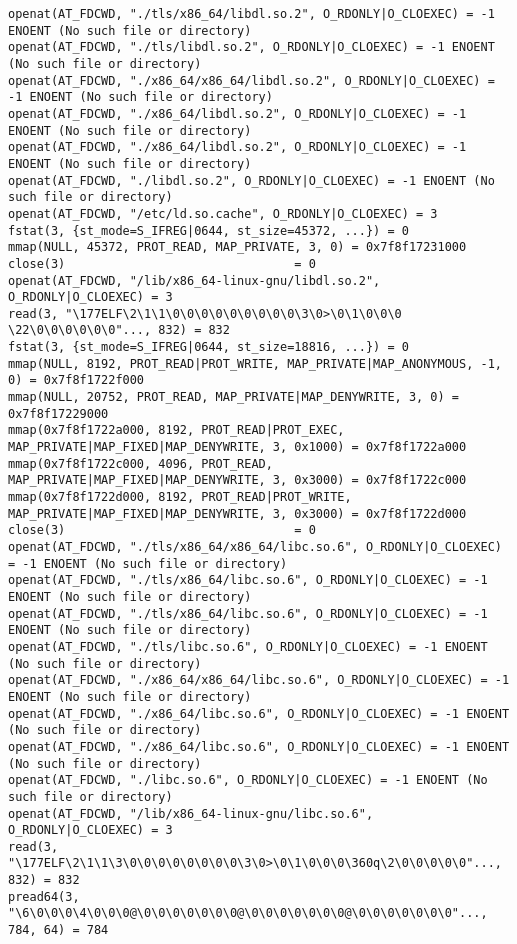 \documentclass[pdf, unicode, 12pt, a4paper,oneside,fleqn]{article}
\begin{document}
{\begin{verbatim}
openat(AT_FDCWD, "./tls/x86_64/libdl.so.2", O_RDONLY|O_CLOEXEC) = -1 ENOENT (No such file or directory)
openat(AT_FDCWD, "./tls/libdl.so.2", O_RDONLY|O_CLOEXEC) = -1 ENOENT (No such file or directory)
openat(AT_FDCWD, "./x86_64/x86_64/libdl.so.2", O_RDONLY|O_CLOEXEC) = -1 ENOENT (No such file or directory)
openat(AT_FDCWD, "./x86_64/libdl.so.2", O_RDONLY|O_CLOEXEC) = -1 ENOENT (No such file or directory)
openat(AT_FDCWD, "./x86_64/libdl.so.2", O_RDONLY|O_CLOEXEC) = -1 ENOENT (No such file or directory)
openat(AT_FDCWD, "./libdl.so.2", O_RDONLY|O_CLOEXEC) = -1 ENOENT (No such file or directory)
openat(AT_FDCWD, "/etc/ld.so.cache", O_RDONLY|O_CLOEXEC) = 3
fstat(3, {st_mode=S_IFREG|0644, st_size=45372, ...}) = 0
mmap(NULL, 45372, PROT_READ, MAP_PRIVATE, 3, 0) = 0x7f8f17231000
close(3)                                = 0
openat(AT_FDCWD, "/lib/x86_64-linux-gnu/libdl.so.2", O_RDONLY|O_CLOEXEC) = 3
read(3, "\177ELF\2\1\1\0\0\0\0\0\0\0\0\0\3\0>\0\1\0\0\0 \22\0\0\0\0\0\0"..., 832) = 832
fstat(3, {st_mode=S_IFREG|0644, st_size=18816, ...}) = 0
mmap(NULL, 8192, PROT_READ|PROT_WRITE, MAP_PRIVATE|MAP_ANONYMOUS, -1, 0) = 0x7f8f1722f000
mmap(NULL, 20752, PROT_READ, MAP_PRIVATE|MAP_DENYWRITE, 3, 0) = 0x7f8f17229000
mmap(0x7f8f1722a000, 8192, PROT_READ|PROT_EXEC, MAP_PRIVATE|MAP_FIXED|MAP_DENYWRITE, 3, 0x1000) = 0x7f8f1722a000
mmap(0x7f8f1722c000, 4096, PROT_READ, MAP_PRIVATE|MAP_FIXED|MAP_DENYWRITE, 3, 0x3000) = 0x7f8f1722c000
mmap(0x7f8f1722d000, 8192, PROT_READ|PROT_WRITE, MAP_PRIVATE|MAP_FIXED|MAP_DENYWRITE, 3, 0x3000) = 0x7f8f1722d000
close(3)                                = 0
openat(AT_FDCWD, "./tls/x86_64/x86_64/libc.so.6", O_RDONLY|O_CLOEXEC) = -1 ENOENT (No such file or directory)
openat(AT_FDCWD, "./tls/x86_64/libc.so.6", O_RDONLY|O_CLOEXEC) = -1 ENOENT (No such file or directory)
openat(AT_FDCWD, "./tls/x86_64/libc.so.6", O_RDONLY|O_CLOEXEC) = -1 ENOENT (No such file or directory)
openat(AT_FDCWD, "./tls/libc.so.6", O_RDONLY|O_CLOEXEC) = -1 ENOENT (No such file or directory)
openat(AT_FDCWD, "./x86_64/x86_64/libc.so.6", O_RDONLY|O_CLOEXEC) = -1 ENOENT (No such file or directory)
openat(AT_FDCWD, "./x86_64/libc.so.6", O_RDONLY|O_CLOEXEC) = -1 ENOENT (No such file or directory)
openat(AT_FDCWD, "./x86_64/libc.so.6", O_RDONLY|O_CLOEXEC) = -1 ENOENT (No such file or directory)
openat(AT_FDCWD, "./libc.so.6", O_RDONLY|O_CLOEXEC) = -1 ENOENT (No such file or directory)
openat(AT_FDCWD, "/lib/x86_64-linux-gnu/libc.so.6", O_RDONLY|O_CLOEXEC) = 3
read(3, "\177ELF\2\1\1\3\0\0\0\0\0\0\0\0\3\0>\0\1\0\0\0\360q\2\0\0\0\0\0"..., 832) = 832
pread64(3, "\6\0\0\0\4\0\0\0@\0\0\0\0\0\0\0@\0\0\0\0\0\0\0@\0\0\0\0\0\0\0"..., 784, 64) = 784

\end{verbatim}}
\end{document}
